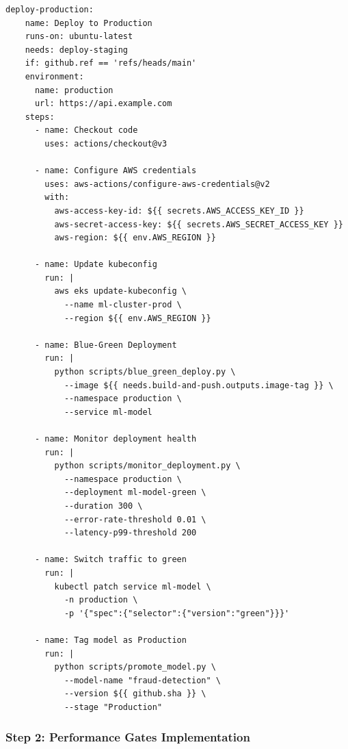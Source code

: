 \begin{lstlisting}[style=yaml, caption=.github/workflows/ml-pipeline.yml]
  deploy-production:
    name: Deploy to Production
    runs-on: ubuntu-latest
    needs: deploy-staging
    if: github.ref == 'refs/heads/main'
    environment:
      name: production
      url: https://api.example.com
    steps:
      - name: Checkout code
        uses: actions/checkout@v3

      - name: Configure AWS credentials
        uses: aws-actions/configure-aws-credentials@v2
        with:
          aws-access-key-id: ${{ secrets.AWS_ACCESS_KEY_ID }}
          aws-secret-access-key: ${{ secrets.AWS_SECRET_ACCESS_KEY }}
          aws-region: ${{ env.AWS_REGION }}

      - name: Update kubeconfig
        run: |
          aws eks update-kubeconfig \
            --name ml-cluster-prod \
            --region ${{ env.AWS_REGION }}

      - name: Blue-Green Deployment
        run: |
          python scripts/blue_green_deploy.py \
            --image ${{ needs.build-and-push.outputs.image-tag }} \
            --namespace production \
            --service ml-model

      - name: Monitor deployment health
        run: |
          python scripts/monitor_deployment.py \
            --namespace production \
            --deployment ml-model-green \
            --duration 300 \
            --error-rate-threshold 0.01 \
            --latency-p99-threshold 200

      - name: Switch traffic to green
        run: |
          kubectl patch service ml-model \
            -n production \
            -p '{"spec":{"selector":{"version":"green"}}}'

      - name: Tag model as Production
        run: |
          python scripts/promote_model.py \
            --model-name "fraud-detection" \
            --version ${{ github.sha }} \
            --stage "Production"
\end{lstlisting}

\subsubsection*{Step 2: Performance Gates Implementation}

